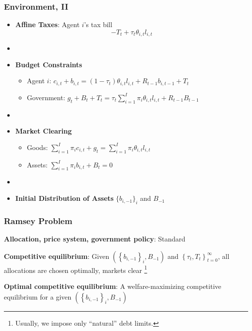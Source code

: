 \documentclass{beamer}
\begin{document}
\begin{frame}
 \frametitle{Environment, II}
 \begin{itemize}
  \item \textbf{Affine Taxes}: Agent $i$'s tax bill
\[- T_t + \tau_t \theta_{i,t}l_{i,t}\]

\item[]
  \item \textbf{Budget Constraints}
  \begin{itemize}
   \item Agent $i$: $ c_{i,t}+b_{i,t}=\left( 1-\tau _{t}\right) \theta _{i,t}l_{i,t}+R_{t-1}b_{i,t-1}+T_{t}$
\item Government: $g_{t}+B_{t}+T_t=\tau _{t}\sum_{i=1}^{I}\pi _{i}\theta_{i,t}l_{i,t}+R_{t-1}B_{t-1}$
  \end{itemize}

\item[]
  \item \textbf{Market Clearing}
  \begin{itemize}
   \item Goods: $\sum_{i=1}^{I}\pi_{i}c_{i,t}+g_t =\sum_{i=1}^{I}\pi
_{i}\theta _{i,t} l_{i,t}$

   \item Assets: $\sum_{i=1}^{I}\pi _{i}b_{i,t}+B_{t}=0$

  \end{itemize}
  \item[]

\item \textbf{Initial Distribution of Assets} $\{b_{i,-1}\}_i$ and $B_{-1}$
\end{itemize}
\end{frame}


\begin{frame}
 \frametitle{Ramsey Problem}

\begin{definition}
\textbf{Allocation, price system, government policy}: Standard

\end{definition}

\begin{definition}
\textbf{Competitive equilibrium}: Given $\left( \left\{ b_{i,-1}\right\}
_{i},B_{-1}\right) $ and $\left\{ \tau _{t},T_{t}\right\} _{t=0}^{\infty }$,
all allocations are chosen optimally, markets clear \footnote{Usually, we impose only  ``natural'' debt limits. }
\end{definition}

\begin{definition}
\textbf{Optimal competitive equilibrium}: A welfare-maximizing competitive
equilibrium for a given $\left( \left\{ b_{i,-1}\right\} _{i},B_{-1}\right) $
\end{definition}

 \end{frame}
\end{document}
